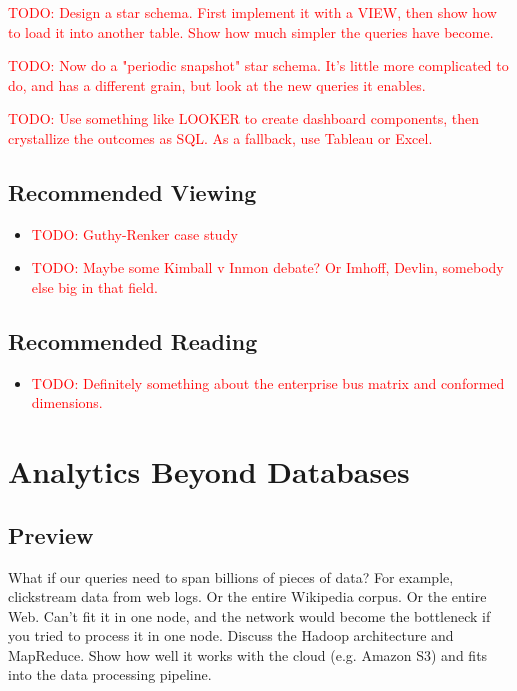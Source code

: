 \documentclass[11pt]{book}
\newcommand{\todo}[1]{\textcolor{red}{TODO: #1}} %
\begin{document}
\todo{Design a star schema.  First implement it with a VIEW, then show how to load it into another table.  Show how much simpler the queries have become.}

\todo{Now do a "periodic snapshot" star schema.  It's little more complicated to do, and has a different grain, but look at the new queries it enables.}

\todo{Use something like LOOKER to create dashboard components, then crystallize the outcomes as SQL.  As a fallback, use Tableau or Excel.}

\section*{Recommended Viewing}
\begin{itemize}
    \item \todo{Guthy-Renker case study}
    \item \todo{Maybe some Kimball v Inmon debate?  Or Imhoff, Devlin, somebody else big in that field.}
\end{itemize}

\section*{Recommended Reading}
\begin{itemize}
    \item \todo{Definitely something about the enterprise bus matrix and conformed dimensions.}
\end{itemize}









\chapter{Analytics Beyond Databases}

\section*{Preview}

What if our queries need to span billions of pieces of data?  For example, clickstream data from web logs.  Or the entire Wikipedia corpus.  Or the entire Web.  Can't fit it in one node, and the network would become the bottleneck if you tried to process it in one node.  Discuss the Hadoop architecture and MapReduce.  Show how well it works with the cloud (e.g. Amazon S3) and fits into the data processing pipeline.
\end{document}
